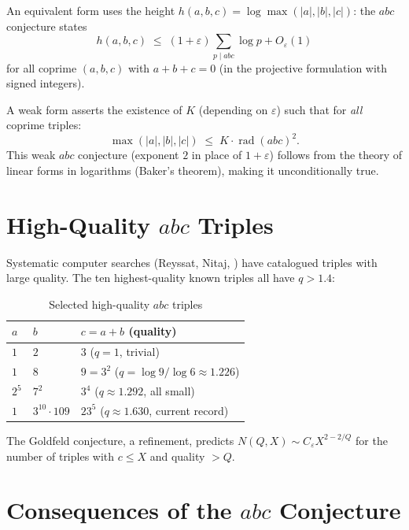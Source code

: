 \documentclass[12pt,a4paper]{article}
\theoremstyle{remark}
\begin{document}
An equivalent form uses the height $h(a,b,c) = \log\max(|a|,|b|,|c|)$: the $abc$
conjecture states
\[
  h(a,b,c) \;\leq\; (1+\varepsilon)\sum_{p\mid abc} \log p + O_\varepsilon(1)
\]
for all coprime $(a,b,c)$ with $a+b+c=0$ (in the projective formulation with signed integers).

A weak form asserts the existence of $K$ (depending on $\varepsilon$) such that for
\emph{all} coprime triples:
\[
  \max(|a|,|b|,|c|) \;\leq\; K \cdot \operatorname{rad}(abc)^2.
\]
This weak $abc$ conjecture (exponent $2$ in place of $1+\varepsilon$) follows from the
theory of linear forms in logarithms (Baker's theorem), making it unconditionally true.

\section{High-Quality $abc$ Triples}

Systematic computer searches (Reyssat, Nitaj, \cite{Nitaj1996}) have catalogued triples
with large quality.  The ten highest-quality known triples all have $q > 1.4$:

\begin{table}[h]
\centering
\begin{tabular}{lll}
\toprule
$a$ & $b$ & $c = a+b$ \quad (quality) \\
\midrule
$1$ & $2$ & $3$ \quad ($q=1$, trivial) \\
$1$ & $8$ & $9 = 3^2$ \quad ($q = \log9/\log6 \approx 1.226$) \\
$2^5$ & $7^2$ & $3^4$ \quad ($q\approx1.292$, all small) \\
$1$ & $3^{10}\!\cdot\!109$ & $23^5$ \quad ($q\approx1.630$, current record) \\
\bottomrule
\end{tabular}
\caption{Selected high-quality $abc$ triples}
\end{table}

The Goldfeld conjecture, a refinement, predicts $N(Q,X) \sim C_\varepsilon X^{2-2/Q}$ for the
number of triples with $c\leq X$ and quality $>Q$.

\section{Consequences of the $abc$ Conjecture}
\end{document}
